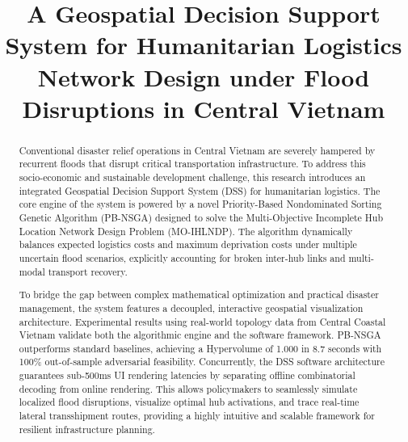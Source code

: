 \documentclass[conference]{IEEEtran}
\begin{document}
\title{A Geospatial Decision Support System for Humanitarian Logistics Network Design under Flood Disruptions in Central Vietnam}

\author{
}

\maketitle

\begin{abstract}
Conventional disaster relief operations in Central Vietnam are severely hampered by recurrent floods that disrupt critical transportation infrastructure. To address this socio-economic and sustainable development challenge, this research introduces an integrated Geospatial Decision Support System (DSS) for humanitarian logistics. The core engine of the system is powered by a novel Priority-Based Nondominated Sorting Genetic Algorithm (PB-NSGA) designed to solve the Multi-Objective Incomplete Hub Location Network Design Problem (MO-IHLNDP). The algorithm dynamically balances expected logistics costs and maximum deprivation costs under multiple uncertain flood scenarios, explicitly accounting for broken inter-hub links and multi-modal transport recovery.

To bridge the gap between complex mathematical optimization and practical disaster management, the system features a decoupled, interactive geospatial visualization architecture. Experimental results using real-world topology data from Central Coastal Vietnam validate both the algorithmic engine and the software framework. PB-NSGA outperforms standard baselines, achieving a Hypervolume of 1.000 in 8.7 seconds with 100\% out-of-sample adversarial feasibility. Concurrently, the DSS software architecture guarantees sub-500ms UI rendering latencies by separating offline combinatorial decoding from online rendering. This allows policymakers to seamlessly simulate localized flood disruptions, visualize optimal hub activations, and trace real-time lateral transshipment routes, providing a highly intuitive and scalable framework for resilient infrastructure planning.
\end{abstract}
\end{document}
